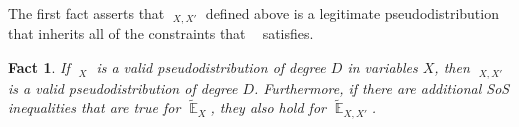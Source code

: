 \documentclass[11pt]{article}
\DeclareMathOperator*{\E}{\mathbb{E}}
\DeclareMathOperator*{\pE}{\widetilde{\mathbb{E}}}
\def \T {\widetilde{\E}}
\def \sos {SoS\xspace}
\renewcommand{\hat}[1]{\widehat{#1}}
\newtheorem{fact}[theorem]{Fact}
\theoremstyle{definition}
\begin{document}
The first fact asserts that $\pE_{X,X'}$ defined above is a 
legitimate pseudodistribution that inherits all of the 
constraints that $\pE$ satisfies.
\begin{fact}\label{fact:indep}
If $\pE_{X}$ is a valid pseudodistribution of degree $D$ in variables $X$, then $\pE_{X,X'} $ is a valid pseudodistribution of degree $D$. Furthermore, if there are additional \sos inequalities that are true for $\T_X$, they also hold for $\T_{X,X'}$.
\end{fact}


\end{document}
